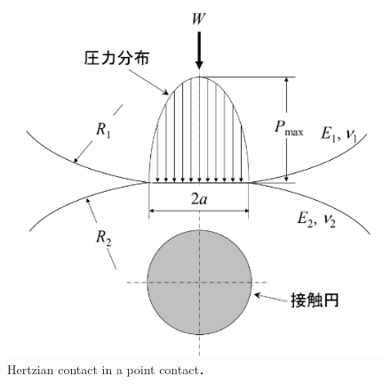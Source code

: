 \begin{figure}[htbp]
    \centering %
    \includegraphics[width=100truemm,clip]{fig/fig_ヘルツ接触.png}
    \caption{Hertzian contact in a point contact．}
    \label{fig:fig_ヘルツ接触}
\end{figure}

